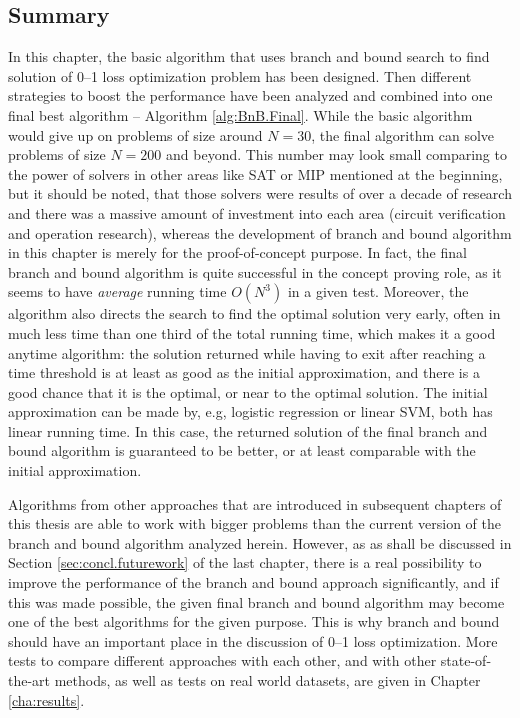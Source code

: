 \subsection{Summary}
\label{sec:bnb.summary}

In this chapter, the basic algorithm that uses branch and bound search to find solution of 0--1 loss optimization problem has been designed. Then different strategies to boost the performance have been analyzed and combined into one final best algorithm -- Algorithm \ref{alg:BnB.Final}. While the basic algorithm would give up on problems of size around $N=30$, the final algorithm can solve problems of size $N=200$ and beyond. This number may look small comparing to the power of solvers in other areas like SAT or MIP mentioned at the beginning, but it should be noted, that those solvers were results of over a decade of research and there was a massive amount of investment into each area (circuit verification and operation research), whereas the development of branch and bound algorithm in this chapter is merely for the proof-of-concept purpose. In fact, the final branch and bound algorithm is quite successful in the concept proving role, as it seems to have \emph{average} running time $O(N^3)$ in a given test. Moreover, the algorithm also directs the search to find the optimal solution very early, often in much less time than one third of the total running time, which makes it a good anytime algorithm: the solution returned while having to exit after reaching a time threshold is at least as good as the initial approximation, and there is a good chance that it is the optimal, or near to the optimal solution. The initial approximation can be made by, e.g, logistic regression or linear SVM, both has linear running time. In this case, the returned solution of the final branch and bound algorithm is guaranteed to be better, or at least comparable with the initial approximation.

Algorithms from other approaches that are introduced in subsequent chapters of this thesis are able to work with bigger problems than the current version of the branch and bound algorithm analyzed herein. However, as as shall be discussed in Section \ref{sec:concl.futurework} of the last chapter, there is a real possibility to improve the performance of the branch and bound approach significantly, and if this was made possible, the given final branch and bound algorithm may become one of the best algorithms for the given purpose. This is why branch and bound should have an important place in the discussion of 0--1 loss optimization. More tests to compare different approaches with each other, and with other state-of-the-art methods, as well as tests on real world datasets, are given in Chapter \ref{cha:results}. 
